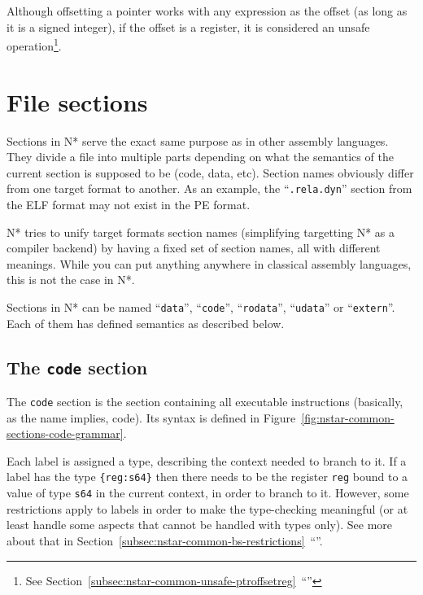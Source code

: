 Although offsetting a pointer works with any expression as the offset (as long as it is a signed integer), if the offset is a register, it is considered an unsafe operation\footnote{See Section~\ref{subsec:nstar-common-unsafe-ptroffsetreg}~``''}.

\section{File sections}\label{sec:nstar-common-sections}

Sections in N* serve the exact same purpose as in other assembly languages. They divide a file into multiple parts depending on what the semantics of the current section is supposed to be (code, data, etc).
Section names obviously differ from one target format to another. As an example, the ``\texttt{.rela.dyn}'' section from the ELF format may not exist in the PE format.

N* tries to unify target formats section names (simplifying targetting N* as a compiler backend) by having a fixed set of section names, all with different meanings. While you can put anything anywhere in classical assembly languages, this is not the case in N*.

Sections in N* can be named ``\texttt{data}'', ``\texttt{code}'', ``\texttt{rodata}'', ``\texttt{udata}'' or ``\texttt{extern}''. Each of them has defined semantics as described below.

\subsection{The \texttt{code} section}\label{subsec:nstar-common-sections-code}

The \texttt{code} section is the section containing all executable instructions (basically, as the name implies, code).
Its syntax is defined in Figure~\ref{fig:nstar-common-sections-code-grammar}.

Each label is assigned a type, describing the context needed to branch to it.
If a label has the type \texttt{\{reg:s64\}} then there needs to be the register \texttt{reg} bound to a value of type \texttt{s64} in the current context, in order to branch to it.
However, some restrictions apply to labels in order to make the type-checking meaningful (or at least handle some aspects that cannot be handled with types only). See more about that in Section~\ref{subsec:nstar-common-bs-restrictions}~``''.

